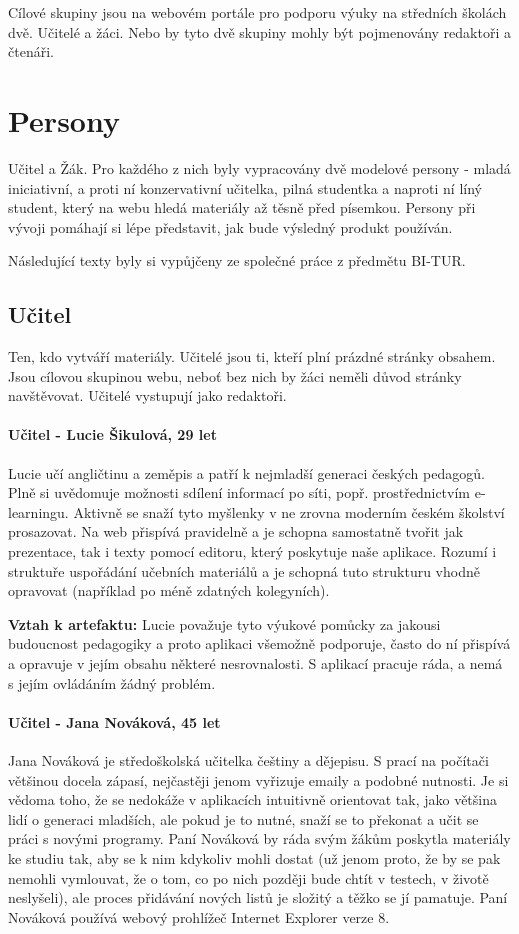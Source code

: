 \documentclass[thesis=B,czech]{FITthesis}[2012/06/26]
\begin{document}
Cílové skupiny jsou na webovém portále pro podporu výuky na středních školách dvě. Učitelé a žáci. Nebo by tyto dvě skupiny mohly být pojmenovány redaktoři a čtenáři.

\section{Persony}

Učitel a Žák. Pro každého z nich byly vypracovány dvě modelové persony - mladá iniciativní, a proti ní konzervativní učitelka, pilná studentka a naproti ní líný student, který na webu hledá materiály až těsně před písemkou. Persony při vývoji pomáhají si lépe představit, jak bude výsledný produkt používán.

Následující texty byly si vypůjčeny ze společné práce z předmětu BI-TUR.

\subsection{Učitel}

Ten, kdo vytváří materiály. Učitelé jsou ti, kteří plní prázdné stránky obsahem. Jsou cílovou skupinou webu, neboť bez nich by žáci neměli důvod stránky navštěvovat. Učitelé vystupují jako redaktoři.

\paragraph{Učitel - Lucie Šikulová, 29 let}
Lucie učí angličtinu a zeměpis a patří k nejmladší generaci českých pedagogů. Plně si uvědomuje možnosti sdílení informací po síti, popř. prostřednictvím e-learningu. Aktivně se snaží tyto myšlenky v ne zrovna moderním českém školství prosazovat. Na web přispívá pravidelně a je schopna samostatně tvořit jak prezentace, tak i texty pomocí editoru, který poskytuje naše aplikace. Rozumí i struktuře uspořádání učebních materiálů a je schopná tuto strukturu vhodně opravovat (například po méně zdatných kolegyních).

\textbf{Vztah k artefaktu:} Lucie považuje tyto výukové pomůcky za jakousi budoucnost pedagogiky a proto aplikaci všemožně podporuje, často do ní přispívá a opravuje v jejím obsahu některé nesrovnalosti. S aplikací pracuje ráda, a nemá s jejím ovládáním žádný problém.

\paragraph{Učitel - Jana Nováková, 45 let}
Jana Nováková je středoškolská učitelka češtiny a dějepisu. S prací na počítači většinou docela zápasí, nejčastěji jenom vyřizuje emaily a podobné nutnosti. Je si vědoma toho, že se nedokáže v aplikacích intuitivně orientovat tak, jako většina lidí o generaci mladších, ale pokud je to nutné, snaží se to překonat a učit se práci s novými programy. Paní Nováková by ráda svým žákům poskytla materiály ke studiu tak, aby se k nim kdykoliv mohli dostat (už jenom proto, že by se pak nemohli vymlouvat, že o tom, co po nich později bude chtít v testech, v životě neslyšeli), ale proces přidávání nových listů je složitý a těžko se jí pamatuje. Paní Nováková používá webový prohlížeč Internet Explorer verze 8.
\end{document}
